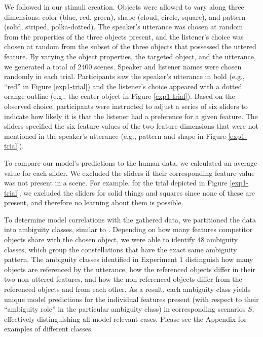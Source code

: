\documentclass[11pt,a4paper]{article}
\begin{document}
We followed  in our stimuli creation. Objects were allowed to vary along three dimensions: color (blue, red, green), shape (cloud, circle, square), and pattern (solid, striped, polka-dotted). The speaker's utterance was chosen at random from the properties of the three objects present, and the listener's choice was chosen at random from the subset of the three objects that possessed the uttered feature. By varying the object properties, the targeted object, and the utterance, we generated a total of 2400 scenes. Speaker and listener names were chosen randomly in each trial. Participants saw the speaker's utterance in bold (e.g., ``red'' in Figure \ref{exp1-trial}) and the listener's choice appeared with a dotted orange outline (e.g., the center object in Figure \ref{exp1-trial}). Based on the observed choice, participants were instructed to adjust a series of six sliders to indicate how likely it is that the listener had a preference for a given feature. The sliders specified the six feature values of the two feature dimensions that were not mentioned in the speaker's utterance (e.g., pattern and shape in Figure \ref{exp1-trial}). 

To compare our model's predictions to the human data, we calculated an average value for each slider.
We excluded the sliders if their corresponding feature value was not present in a scene. For example, for the trial depicted in Figure \ref{exp1-trial}, we excluded the sliders for solid things and squares since none of these are present, and therefore no learning about them is possible.

To determine model correlations with the gathered data, we partitioned the data into ambiguity classes, similar to . Depending on how many features competitor objects share with the chosen object, we were able to identify 48 ambiguity classes, which group the constellations that have the exact same ambiguity pattern. The ambiguity classes identified in Experiment 1 distinguish how many objects are referenced by the utterance, how the referenced objects differ in their two non-uttered features, and how the non-referenced objects differ from the referenced objects and from each other.
As a result, each ambiguity class yields unique model predictions for the individual features present (with respect to their ``ambiguity role'' in the particular ambiguity class) in corresponding scenarios $S$, effectively distinguishing all model-relevant cases. Please see the Appendix for examples of different classes.
\end{document}
